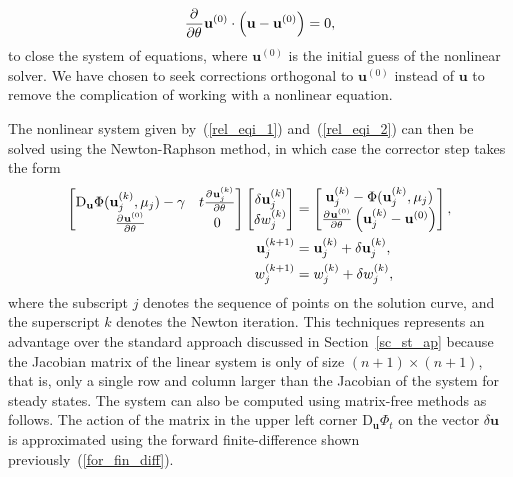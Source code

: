 \begin{align}
\label{rel_eqi_2}
\frac{\partial^{}} {\partial \theta^{}}\mathbf{u}^{(0)}\cdot\left(\mathbf{u} - \mathbf{u}^{(0)} \right) = 0,
\end{align}
to close the system of equations, where $\mathbf{u}^{(0)}$ is the initial guess of the nonlinear solver. We have chosen to seek corrections orthogonal to $\mathbf{u}^{(0)}$ instead of $\mathbf{u}$ to remove the complication of working with a nonlinear equation.

The nonlinear system given by~(\ref{rel_eqi_1}) and~(\ref{rel_eqi_2}) can then be solved using the Newton-Raphson method, in which case the corrector step takes the form
\begin{subequations}\begin{align}
\label{lin_sys_limit_cycle}
\begin{bmatrix}
\textrm{D}_{\mathbf{u}} \Phi(\mathbf{u}_{j}^{(k)},\mu_j) - \gamma  & t\frac{\partial^{}\mathbf{u}_{j}^{(k)}} {\partial \theta^{}}\\
\frac{\partial^{}\mathbf{u}^{(0)}} {\partial \theta^{}}   & 0
\end{bmatrix}
\begin{bmatrix}
\delta \textbf{u}_j^{(k)}\\
\delta w_{j}^{(k)}
\end{bmatrix}
&=
\begin{bmatrix}
\mathbf{u}_{j}^{(k)}-\Phi(\mathbf{u}_j^{(k)},\mu_{j})  \\
\frac{\partial^{}\mathbf{u}^{(0)}} {\partial \theta^{}}\left(\mathbf{u}_{j}^{(k)} - \mathbf{u}^{(0)}\right)
\end{bmatrix},\\
\mathbf{u}_{j}^{(k+1)} &= \mathbf{u}_{j}^{(k)} + \delta\mathbf{u}_{j}^{(k)},\\
w_{j}^{(k+1)}& = w_{j}^{(k)} + \delta w_j^{(k)},
\end{align}\end{subequations}
where the subscript $j$ denotes the sequence of points on the solution curve, and the superscript $k$ denotes the Newton iteration.
This techniques represents an advantage over the standard approach discussed in Section~\ref{sc_st_ap} because the Jacobian matrix of the linear system is only of size ${(n+1)\times(n+1)}$, that is, only a single row and column larger than the Jacobian of the system for steady states. The system can also be computed using matrix-free methods as follows.
The action of the matrix in the upper left corner $\mathrm{D}_{\mathbf{u}}\Phi_{t}$ on the vector $\delta\mathbf{u}$ is approximated using the forward finite-difference shown previously~(\ref{for_fin_diff}).
